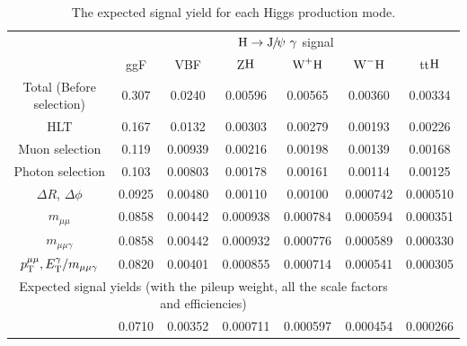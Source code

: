 	\begin{table}[h]
	\scriptsize
	\begin{center}
	  \begin{tabular}{ccccccc}
	  \hline
	    & \multicolumn{6}{c}{$\mathrm{H}\rightarrow{\mathrm{J}\hspace{-.08em}/\hspace{-.14em}\psi}\ \gamma$ signal}\\
	    \cline{2-7}
	    & ggF & VBF & Z$\mathrm{H}$ & $\text{W}^{+}\mathrm{H}$ & $\text{W}^{-}\mathrm{H}$ & tt$\mathrm{H}$\\
	    \hline
	    Total (Before selection)& 0.307 & 0.0240 & 0.00596 & 0.00565 & 0.00360 & 0.00334\\
	    HLT & 0.167 & 0.0132 & 0.00303 & 0.00279 & 0.00193 & 0.00226\\
	    Muon selection & 0.119 & 0.00939 & 0.00216 & 0.00198 & 0.00139 & 0.00168\\
	    Photon selection & 0.103 & 0.00803 & 0.00178 & 0.00161 & 0.00114 & 0.00125 \\
	    $\Delta R$, $\Delta\phi$ & 0.0925 & 0.00480 & 0.00110 & 0.00100 & 0.000742 & 0.000510\\
	    $m_{\mu\mu}$ & 0.0858 & 0.00442 & 0.000938 & 0.000784 & 0.000594 & 0.000351\\
	    $m_{\mu\mu\gamma}$& 0.0858 & 0.00442 & 0.000932 & 0.000776 & 0.000589 & 0.000330 \\
	    $p_{\mathrm{T}}^{\mu\mu},E_{\mathrm{T}}^{\gamma}/m_{\mu\mu\gamma}$ & 0.0820 & 0.00401 & 0.000855 & 0.000714 & 0.000541 & 0.000305 \\
	    \hline
	    \multicolumn{6}{c}{Expected signal yields (with the pileup weight, all the scale factors and efficiencies)}\\
	    \hline
	   & 0.0710 & 0.00352 & 0.000711 & 0.000597 & 0.000454 & 0.000266\\
	   \hline
	  \end{tabular}
	  \caption{The expected signal yield for each Higgs production mode.}
	  \end{center}
	\end{table}
		
